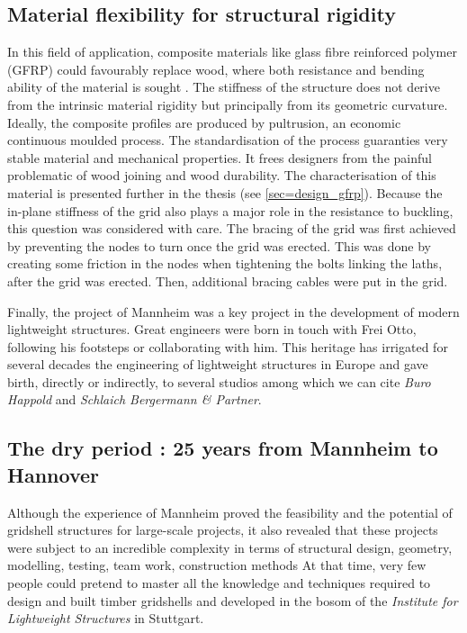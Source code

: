 \subsection{Material flexibility for structural rigidity}\label{sec=def_flexibility}
In this field of application, composite materials like glass fibre reinforced polymer (GFRP) could favourably replace wood, where both resistance and bending ability of the material is sought \cite{Douthe2010a}. The stiffness of the structure does not derive from the intrinsic material rigidity but principally from its geometric curvature. Ideally, the composite profiles are produced by pultrusion, an economic continuous moulded process. The standardisation of the process guaranties very stable material and mechanical properties. It frees designers from the painful problematic of wood joining and wood durability. The characterisation of this material is presented further in the thesis (see \cref{sec=design_gfrp}).
Because the in-plane stiffness of the grid also plays a major role in the resistance to buckling, this question was considered with care. The bracing of the grid was first achieved by preventing the nodes to turn once the grid was erected. This was done by creating some friction in the nodes when tightening the bolts linking the laths, after the grid was erected. Then, additional bracing cables were put in the grid.

Finally, the project of Mannheim was a key project in the development of modern lightweight structures. Great engineers were born in touch with Frei Otto, following his footsteps or collaborating with him. This heritage has irrigated for several decades the engineering of lightweight structures in Europe and gave birth, directly or indirectly, to several studios among which we can cite \emph{Buro Happold} and \emph{Schlaich Bergermann \& Partner}.

\subsection{The dry period : 25 years from Mannheim to Hannover}

Although the experience of Mannheim proved the feasibility and the potential of gridshell structures for large-scale projects, it also revealed that these projects were subject to an incredible complexity in terms of structural design, geometry, modelling, testing, team work, construction methods \telp{} At that time, very few people could pretend to master all the knowledge and techniques required to design and built timber gridshells and developed in the bosom of the \emph{Institute for Lightweight Structures} in Stuttgart.

